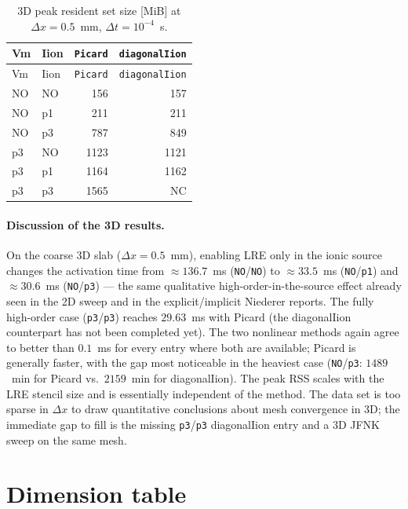 \documentclass[11pt,a4paper]{article}
\newcommand{\code}[1]{\texttt{\small #1}}
\begin{document}
\begin{center}\footnotesize
\begin{longtable}{llrr}
\caption{3D peak resident set size [MiB] at $\Delta x = 0.5$~mm,
$\Delta t = 10^{-4}$~s.}\\
\toprule
Vm & Iion & \code{Picard} & \code{diagonalIion} \\
\midrule\endfirsthead\toprule
Vm & Iion & \code{Picard} & \code{diagonalIion} \\
\midrule\endhead
NO & NO &  156 &  157 \\
NO & p1 &  211 &  211 \\
NO & p3 &  787 &  849 \\
p3 & NO & 1123 & 1121 \\
p3 & p1 & 1164 & 1162 \\
p3 & p3 & 1565 & NC   \\
\bottomrule\end{longtable}\end{center}
\paragraph{Discussion of the 3D results.}
On the coarse 3D slab ($\Delta x = 0.5$~mm), enabling LRE only in the ionic source
changes the activation time from $\approx 136.7$~ms (\code{NO}/\code{NO}) to
$\approx 33.5$~ms (\code{NO}/\code{p1}) and $\approx 30.6$~ms (\code{NO}/\code{p3}) ---
the same qualitative high-order-in-the-source effect already seen in the 2D sweep and in
the explicit/implicit Niederer reports. The fully high-order case
(\code{p3}/\code{p3}) reaches $29.63$~ms with Picard (the diagonalIion counterpart has
not been completed yet). The two nonlinear methods again agree to better than
$0.1$~ms for every entry where both are available; Picard is generally
faster, with the gap most noticeable in the heaviest case (\code{NO}/\code{p3}:
$1489$~min for Picard vs.\ $2159$~min for diagonalIion). The peak RSS scales with the
LRE stencil size and is essentially independent of the method. The data set
is too sparse in $\Delta x$ to draw quantitative conclusions about mesh
convergence in 3D; the immediate gap to fill is the missing
\code{p3}/\code{p3} diagonalIion entry and a 3D JFNK sweep on the same mesh.

\appendix
\section{Dimension table}
\end{document}
